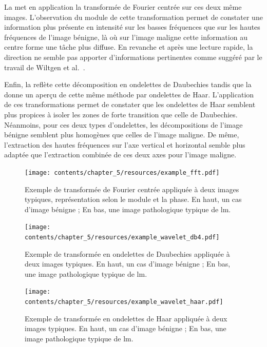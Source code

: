 La  met en application la transformée de Fourier centrée sur ces deux même images. L'observation du module de cette transformation permet de constater une information plus présente en intensité sur les basses fréquences que sur les hautes fréquences de l'image bénigne, là où sur l'image maligne cette information au centre forme une tâche plus diffuse. En revanche et après une lecture rapide, la direction ne semble pas apporter d'informations pertinentes comme suggéré par le travail de Wiltgen et al.~\cite{Wiltgen2008}.\par

Enfin, la  reflète cette décomposition en ondelettes de Daubechies tandis que la  donne un aperçu de cette même méthode par ondelettes de Haar. L'application de ces transformations permet de constater que les ondelettes de Haar semblent plus propices à isoler les zones de forte transition que celle de Daubechies. Néanmoins, pour ces deux types d'ondelettes, les décompositions de l'image bénigne semblent plus homogènes que celles de l'image maligne. De même, l'extraction des hautes fréquences sur l'axe vertical et horizontal semble plus adaptée que l'extraction combinée de ces deux axes pour l'image maligne.\par

\begin{figure}[H]
    \centering
    \texttt{[image: contents/chapter\_5/resources/example\_fft.pdf]}
    \caption{Exemple de transformée de Fourier centrée appliquée à deux images typiques, représentation selon le module et la phase. En haut, un cas d'image bénigne ; En bas, une image pathologique typique de \gls{lm}.}
    \label{fig:example_fft}
\end{figure}\par

\begin{figure}[H]
    \centering
    \texttt{[image: contents/chapter\_5/resources/example\_wavelet\_db4.pdf]}
    \caption{Exemple de transformée en ondelettes de Daubechies appliquée à deux images typiques. En haut, un cas d'image bénigne ; En bas, une image pathologique typique de \gls{lm}.}
    \label{fig:example_wavelet_db4}
\end{figure}\par

\begin{figure}[H]
    \centering
    \texttt{[image: contents/chapter\_5/resources/example\_wavelet\_haar.pdf]}
    \caption{Exemple de transformée en ondelettes de Haar appliquée à deux images typiques. En haut, un cas d'image bénigne ; En bas, une image pathologique typique de \gls{lm}.}
    \label{fig:example_wavelet_haar}
\end{figure}\par

